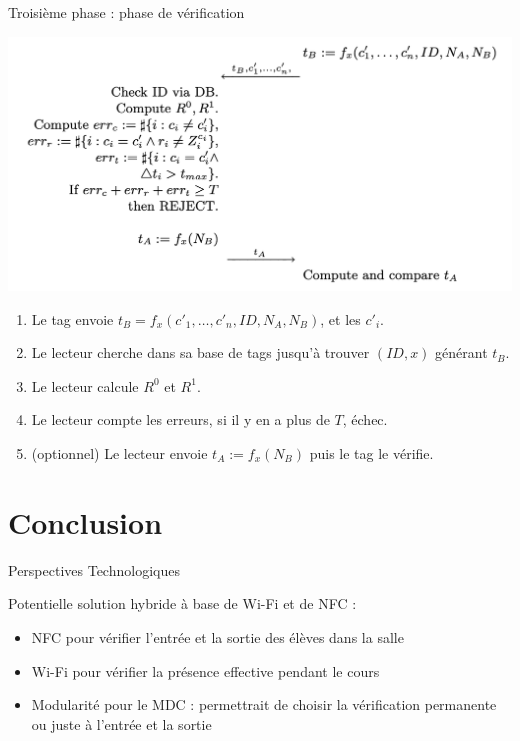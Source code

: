 \documentclass[aspectratio=169]{beamer}
\begin{document}
\begin{frame}{Troisième phase : phase de vérification}
  \begin{multicols}{2}
    \begin{minipage}[c]{\linewidth}
      \centering
      \bigskip
      \bigskip
      \bigskip
      \includegraphics[width=\linewidth]{assets/sk-phase3.png}
    \end{minipage}

    \begin{minipage}[t]{\linewidth}
      \begin{enumerate}
        \item Le tag envoie $t_B = f_x(c'_1, \hdots, c'_n, ID, N_A, N_B)$, et les $c'_i$.
        \item Le lecteur cherche dans sa base de tags jusqu'à trouver $(ID, x)$ générant $t_B$.
        \item Le lecteur calcule $R^0$ et $R^1$.
        \item Le lecteur compte les erreurs, si il y en a plus de $T$, échec.
        \item (optionnel) Le lecteur envoie $t_A := f_x(N_B)$ puis le tag le vérifie.
      \end{enumerate}
    \end{minipage}
  \end{multicols}
\end{frame}

\section{Conclusion}

\begin{frame}{Perspectives Technologiques}

Potentielle solution hybride à base de Wi-Fi et de NFC :
\pause
\begin{itemize}
    \item NFC pour vérifier l'entrée et la sortie des élèves dans la salle
    \pause
    \item Wi-Fi pour vérifier la présence effective pendant le cours
    \pause
    \item Modularité pour le MDC : permettrait de choisir la vérification permanente ou juste à l'entrée et la sortie
\end{itemize}

\end{frame}
\end{document}
